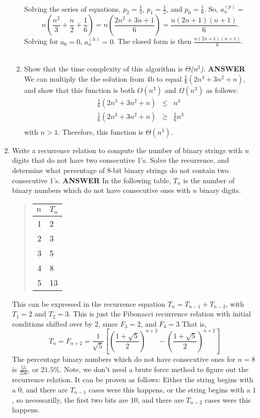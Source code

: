 \documentclass{article}
\newcommand{\fr}[2]{\frac{#1}{#2}}
\begin{document}
\begin{enumerate}
\begin{enumerate}
\begin{eqnarray*}
\end{eqnarray*}
Solving the series of equations, $p_2 = \frac{1}{3}$, $p_1 =
\frac{1}{2}$, and $p_0 = \frac{1}{6}$. So, $a^{(p)}_n =$
$$
n\left( \frac{n^2}{3} + \frac{n}{2} + \frac{1}{6} \right)
 = n \left( \frac{2n^2 + 3n + 1}{6} \right) = \frac{n(2n + 1)(n + 1)}{6}.
$$
Solving for $a_0 = 0$, $a^{(h)}_n = 0$. The closed form is then
$\frac{n(2n + 1)(n + 1)}{6}$.
\\\\
\item
Show that the time complexity of this algorithm is
\ensuremath{\Theta}\textit{(n}$^{\mathit{3}}$\textit{).} \vskip
10pt  \textbf{ANSWER} We can multiply the the solution from 4b to
equal $\frac{1}{6}(2n^3 + 3n^2 + n)$, and show that this function
 is both $O(n^3)$ and $\Omega(n^3)$ as follows:\\
\begin{eqnarray*}
\frac{1}{6}(2n^3 + 3n^2 + n) & \leq & n^3 \\
\frac{1}{6}(2n^3 + 3n^2 + n) & \geq & \frac{1}{6}n^3 \\
\end{eqnarray*}
with $n > 1$. Therefore, this function is $\Theta(n^3)$.
\end{enumerate}

\item
 Write a recurrence relation to compute the number of binary
strings with \textit{n} digits that do not have two consecutive
1's. Solve the recurrence, and determine what percentage of 8-bit
binary strings do not contain two consecutive 1's. \vskip 10pt
\textbf{ANSWER} In the following table, $T_n$ is the number of
binary numbers which do not have consecutive ones with $n$ binary
digits.
\begin{quote}
\begin{tabular}{r|l}
$n$ & $T_n$ \\
\hline
1 & 2   \\
2 & 3   \\
3 & 5   \\
4 & 8   \\
5 & 13  \\
\end{tabular}
\end{quote}
This can be expressed in the recurrence equation $T_n = T_{n-1} +
T_{n-2}$, with $T_1 = 2$ and $T_2 =3 $. This is just the Fibonacci
recurrence relation with initial conditions shifted over by 2,
since $F_3 = 2$, and $F_4 = 3$ That is,
\[
T_n = F_{n+2} =  \fr{1}{\sqrt{5}}\left[(\fr{1 +\sqrt{5}}{2})^{n+2}
- (\fr{1 + \sqrt{5} }{2})^{n+2}
 \right]
\]
The percentage binary numbers which do not have consecutive ones
for $n = 8$ is $\fr{55}{256}$, or $21.5\%$. Note, we don't need a
brute force method to figure out the recurrence relation. It can
be proven as follows: Either the string begins with a $0$, and
there are $T_{n-1}$ cases were this happens, or the string begins
with a $1$, so necessarilly, the first two bits are $10$, and
there are $T_{n-2}$ cases were this happens.


\end{enumerate}
\end{document}
